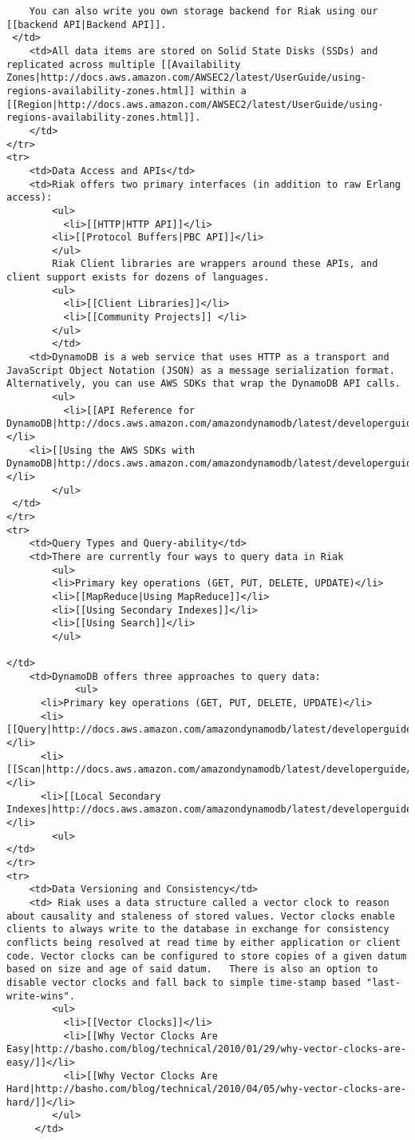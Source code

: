 \documentclass[letter]{book}
\newcounter{tab}[chapter]
\begin{document}
\begin{shaded}\begin{verbatim}
    You can also write you own storage backend for Riak using our [[backend API|Backend API]].
 </td>
    <td>All data items are stored on Solid State Disks (SSDs) and replicated across multiple [[Availability Zones|http://docs.aws.amazon.com/AWSEC2/latest/UserGuide/using-regions-availability-zones.html]] within a [[Region|http://docs.aws.amazon.com/AWSEC2/latest/UserGuide/using-regions-availability-zones.html]].
    </td>
</tr>
<tr>
    <td>Data Access and APIs</td>
    <td>Riak offers two primary interfaces (in addition to raw Erlang access):
		<ul>
		  <li>[[HTTP|HTTP API]]</li>
		<li>[[Protocol Buffers|PBC API]]</li>
		</ul>
		Riak Client libraries are wrappers around these APIs, and client support exists for dozens of languages.
		<ul>
		  <li>[[Client Libraries]]</li>
		  <li>[[Community Projects]] </li>
		</ul>
		</td>
    <td>DynamoDB is a web service that uses HTTP as a transport and JavaScript Object Notation (JSON) as a message serialization format. Alternatively, you can use AWS SDKs that wrap the DynamoDB API calls.
        <ul>
          <li>[[API Reference for DynamoDB|http://docs.aws.amazon.com/amazondynamodb/latest/developerguide/API.html]]</li>
    <li>[[Using the AWS SDKs with DynamoDB|http://docs.aws.amazon.com/amazondynamodb/latest/developerguide/UsingAWSSDK.html]]</li>
        </ul>
 </td>
</tr>
<tr>
    <td>Query Types and Query-ability</td>
    <td>There are currently four ways to query data in Riak
        <ul>
        <li>Primary key operations (GET, PUT, DELETE, UPDATE)</li>
        <li>[[MapReduce|Using MapReduce]]</li>
        <li>[[Using Secondary Indexes]]</li>
        <li>[[Using Search]]</li>
        </ul>

</td>
    <td>DynamoDB offers three approaches to query data:
            <ul>
      <li>Primary key operations (GET, PUT, DELETE, UPDATE)</li>
      <li>[[Query|http://docs.aws.amazon.com/amazondynamodb/latest/developerguide/queryingdynamodb.html]]</li>
      <li>[[Scan|http://docs.aws.amazon.com/amazondynamodb/latest/developerguide/scandynamodb.html]]</li>
      <li>[[Local Secondary Indexes|http://docs.aws.amazon.com/amazondynamodb/latest/developerguide/LSI.html]]</li>
        <ul>
</td>
</tr>
<tr>
    <td>Data Versioning and Consistency</td>
    <td> Riak uses a data structure called a vector clock to reason about causality and staleness of stored values. Vector clocks enable clients to always write to the database in exchange for consistency conflicts being resolved at read time by either application or client code. Vector clocks can be configured to store copies of a given datum based on size and age of said datum.   There is also an option to disable vector clocks and fall back to simple time-stamp based "last-write-wins".
        <ul>
          <li>[[Vector Clocks]]</li>
          <li>[[Why Vector Clocks Are Easy|http://basho.com/blog/technical/2010/01/29/why-vector-clocks-are-easy/]]</li>
          <li>[[Why Vector Clocks Are Hard|http://basho.com/blog/technical/2010/04/05/why-vector-clocks-are-hard/]]</li>
        </ul>
     </td>


\end{verbatim}
\end{shaded}
\end{document}
